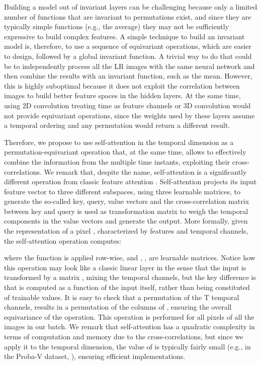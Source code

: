 \documentclass[journal]{IEEEtran}
\begin{document}
Building a model out of invariant layers can be challenging because only a limited number of functions that are invariant to permutations exist, and since they are typically simple functions (e.g., the average) they may not be sufficiently expressive to build complex features. A simple technique to build an invariant model is, therefore, to use a sequence of equivariant operations, which are easier to design, followed by a global invariant function.
A trivial way to do that could be to independently process all the LR images with the same neural network and then combine the results with an invariant function, such as the mean. However, this is highly suboptimal because it does not exploit the correlation between images to build better feature spaces in the hidden layers. At the same time, using 2D convolution treating time as feature channels or 3D convolution would not provide equivariant operations, since the weights used by these layers assume a temporal ordering and any permutation would return a different result.

Therefore, we propose to use self-attention \cite{vaswani2017attention} in the temporal dimension as a permutation-equivariant operation that, at the same time, allows to effectively combine the information from the multiple time instants, exploiting their cross-correlations. We remark that, despite the name, self-attention is a significantly different operation from classic feature attention \cite{zhang2018image}. Self-attention projects its input feature vector to three different subspaces, using three learnable matrices, to generate the so-called key, query, value vectors and the cross-correlation matrix between key and query is used as transformation matrix to weigh the temporal components in the value vectors and generate the output. More formally, given the representation of a pixel , characterized by  features and  temporal channels, the self-attention operation computes:

where the  function is applied row-wise, and , ,  are learnable matrices.
Notice how this operation may look like a classic linear layer in the sense that the input is transformed by a matrix , mixing the temporal channels, but the key difference is that  is computed as a function of the input itself, rather than being constituted of trainable values. It is easy to check that a permutation of the T temporal channels, results in a permutation of the columns of , ensuring the overall equivariance of the operation. This operation is performed for all pixels of all the images in our batch. We remark that self-attention has a quadratic complexity  in terms of computation and memory due to the  cross-correlations, but since we apply it to the temporal dimension, the value of  is typically fairly small (e.g., in the Proba-V dataset, ), ensuring efficient implementations.
\end{document}
